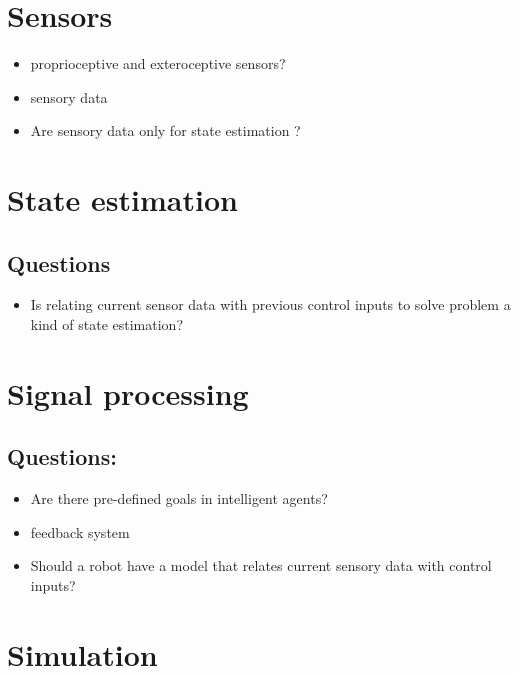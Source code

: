 \section{Sensors}
    \begin{itemize}
        \item proprioceptive and exteroceptive sensors?
        \item sensory data
        \item Are sensory data only for state estimation ?
    \end{itemize}

\section{State estimation}
    \subsection{Questions}
        \begin{itemize}
            \item Is relating current sensor data with previous control inputs to solve problem a kind of state estimation?
        \end{itemize}

\section{Signal processing}
    \subsection{Questions:}
        \begin{itemize}
            \item Are there pre-defined goals in intelligent agents?
            \item feedback system
            \item Should a robot have a model that relates current sensory data with control inputs?
        \end{itemize}
\section{Simulation}
    
